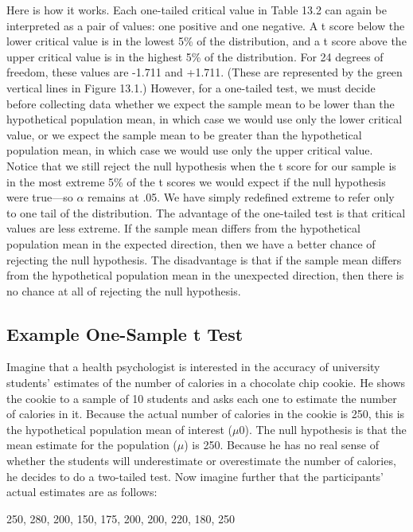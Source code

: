 Here is how it works. Each one-tailed critical value in Table 13.2 can again be interpreted as a pair of values: one positive and one negative. A t score below the lower critical value is in the lowest 5\% of the distribution, and a t score above the upper critical value is in the highest 5\% of the distribution. For 24 degrees of freedom, these values are -1.711 and +1.711. (These are represented by the green vertical lines in Figure 13.1.) However, for a one-tailed test, we must decide before collecting data whether we expect the sample mean to be lower than the hypothetical population mean, in which case we would use only the lower critical value, or we expect the sample mean to be greater than the hypothetical population mean, in which case we would use only the upper critical value. Notice that we still reject the null hypothesis when the t score for our sample is in the most extreme 5\% of the t scores we would expect if the null hypothesis were true---so $\alpha$ remains at .05. We have simply redefined extreme to refer only to one tail of the distribution. The advantage of the one-tailed test is that critical values are less extreme. If the sample mean differs from the hypothetical population mean in the expected direction, then we have a better chance of rejecting the null hypothesis. The disadvantage is that if the sample mean differs from the hypothetical population mean in the unexpected direction, then there is no chance at all of rejecting the null hypothesis.


\subsection{Example One-Sample t Test}


Imagine that a health psychologist is interested in the accuracy of university students' estimates of the number of calories in a chocolate chip cookie. He shows the cookie to a sample of 10 students and asks each one to estimate the number of calories in it. Because the actual number of calories in the cookie is 250, this is the hypothetical population mean of interest ($\mu$0). The null hypothesis is that the mean estimate for the population ($\mu$) is 250. Because he has no real sense of whether the students will underestimate or overestimate the number of calories, he decides to do a two-tailed test. Now imagine further that the participants' actual estimates are as follows:


\begin{kframe}
250, 280, 200, 150, 175, 200, 200, 220, 180, 250
\end{kframe}

